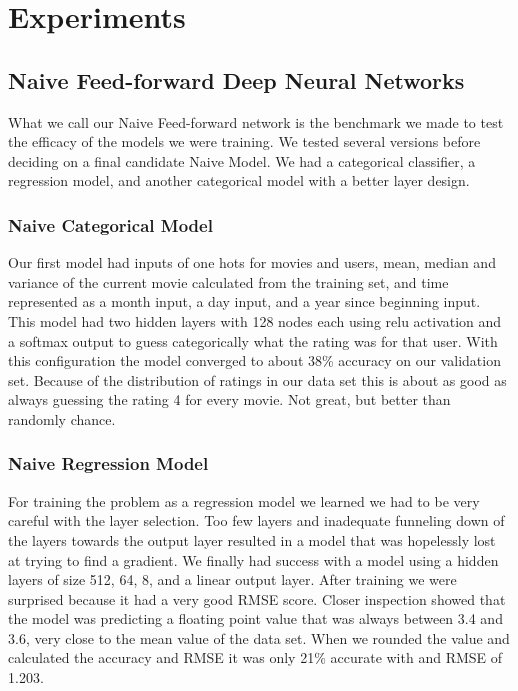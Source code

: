 \section{Experiments}
\subsection{Naive Feed-forward Deep Neural Networks}

What we call our Naive Feed-forward network is the benchmark we made to test the efficacy of the models we were training. We tested several versions before deciding on a final candidate Naive Model. We had a categorical classifier, a regression model, and another categorical model with a better layer design.

\subsubsection{Naive Categorical Model} 

Our first model had inputs of one hots for movies and users, mean, median and variance of the current movie calculated from the training set, and time represented as a month input, a day input, and a year since beginning input. This model had two hidden layers with 128 nodes each using relu activation and a softmax output to guess categorically what the rating was for that user. With this configuration the model converged to about 38\% accuracy on our validation set. Because of the distribution of ratings in our data set this is about as good as always guessing the rating 4 for every movie. Not great, but better than randomly chance.

\subsubsection{Naive Regression Model}

For training the problem as a regression model we learned we had to be very careful with the layer selection. Too few layers and inadequate funneling down of the layers towards the output layer resulted in a model that was hopelessly lost at trying to find a gradient. We finally had success with a model using a hidden layers of size 512, 64, 8, and a linear output layer. After training we were surprised  because it had a very good RMSE score. Closer inspection showed that the model was predicting a floating point value that was always between 3.4 and 3.6, very close to the mean value of the data set. When we rounded the value and calculated the accuracy and RMSE it was only 21\% accurate with and RMSE of 1.203.

